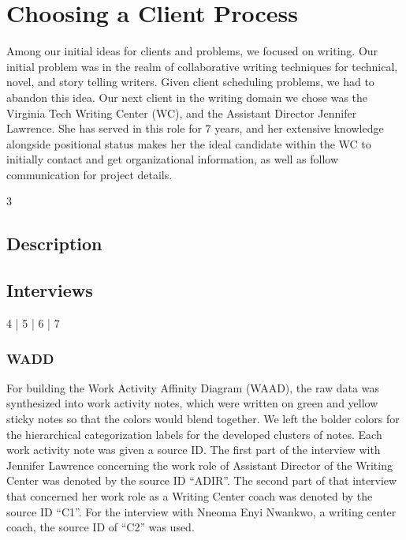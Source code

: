\documentclass[12pt]{article} %
\begin{document}

\section{Choosing a Client Process} %

Among our initial ideas for clients and problems, we focused on writing.
Our initial problem was in the realm of collaborative writing techniques for technical, novel, and story telling writers.
Given client scheduling problems, we had to abandon this idea.
Our next client in the writing domain we chose was the Virginia Tech Writing Center (WC), and the Assistant Director Jennifer Lawrence.
She has served in this role for 7 years, and her extensive knowledge alongside positional status makes her the ideal candidate within the WC to initially contact and get organizational information, as well as follow communication for project details.

3 


\subsection{Description} %

\subsection{Interviews} %

4 | 5 | 6 | 7

\subsubsection{WADD} %

For building the Work Activity Affinity Diagram (WAAD), the raw data was synthesized into work activity notes, which were written on green and yellow sticky notes so that the colors would blend together.
We left the bolder colors for the hierarchical categorization labels for the developed clusters of notes.  Each work activity note was given a source ID.
The first part of the interview with Jennifer Lawrence concerning the work role of Assistant Director of the Writing Center was denoted by the source ID “ADIR”.
The second part of that interview that concerned her work role as a Writing Center coach was denoted by the source ID “C1”.
For the interview with Nneoma Enyi Nwankwo, a writing center coach, the source ID of “C2” was used. 
\end{document}
